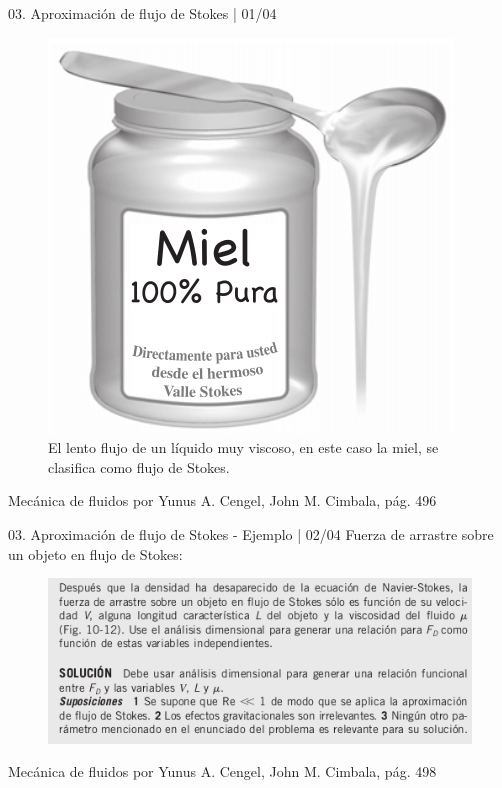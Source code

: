 \begin{frame}{03. Aproximación de flujo de Stokes | 01/04}
\justifying
\begin{figure}[H]
\centering
\includegraphics[scale=0.35]{Section_Files/S3-imagenes-Jhon/0022.png}
\caption{El lento flujo de un líquido muy viscoso, en este caso la miel, se clasifica como flujo de Stokes.}
\end{figure}
{\tiny Mecánica de fluidos por Yunus A. Cengel, John M. Cimbala, pág. 496}
\end{frame}

\begin{frame}{03. Aproximación de flujo de Stokes - Ejemplo |  02/04}
\justifying
Fuerza de arrastre sobre un objeto en flujo de Stokes:
\begin{figure}[H]
\centering
\includegraphics[scale=0.55]{Section_Files/S3-imagenes-Jhon/0027-01.png}
\end{figure}
{\tiny Mecánica de fluidos por Yunus A. Cengel, John M. Cimbala, pág. 498}
\end{frame}

